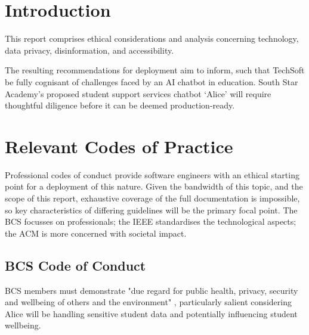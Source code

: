\documentclass[14pt,a4paper]{article}
\begin{document}
\thispagestyle{empty}

\newpage

\tableofcontents
{}

\newpage


\begin{multicols}{2}
\section{Introduction}
This report comprises ethical considerations and analysis concerning technology, data privacy, disinformation, and accessibility.

The resulting recommendations for deployment aim to inform, such that TechSoft be fully cognisant of challenges faced by an AI chatbot in education.
South Star Academy's proposed student support services chatbot `Alice' will require thoughtful diligence before it can be deemed production-ready.





\section{Relevant Codes of Practice}
Professional codes of conduct provide software engineers with an ethical starting point for a deployment of this nature.
Given the bandwidth of this topic, and the scope of this report, exhaustive coverage of the full documentation is impossible, so key characteristics of differing guidelines will be the primary focal point.
The BCS focusses on professionals; the IEEE standardises the technological aspects; the ACM is more concerned with societal impact.

\subsection{BCS Code of Conduct}
BCS members must demonstrate "due regard for public health, privacy, security and wellbeing of others and the environment" \textit{\parencite[p. 2]{BCS2024}}, particularly salient considering Alice will be handling sensitive student data and potentially influencing student wellbeing.


\end{multicols}
\end{document}
